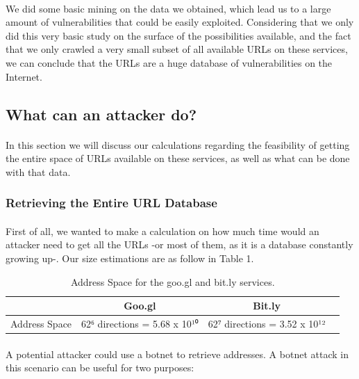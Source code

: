 \documentclass[12pt]{article}
\begin{document}
\paragraph{}
We did some basic mining on the data we obtained, which lead us to a large amount of vulnerabilities that could be easily exploited. Considering that we only did this very basic study on the surface of the possibilities available, and the fact that we only crawled a very small subset of all available URLs on these services, we can conclude that the URLs are a huge database of vulnerabilities on the Internet.

\subsection{What can an attacker do?}

\paragraph{}
In this section we will discuss our calculations regarding the feasibility of getting the entire space of URLs available on these services, as well as what can be done with that data.

\subsubsection{Retrieving the Entire URL Database}

\paragraph{}
First of all, we wanted to make a calculation on how much time would an attacker need to get all the URLs -or most of them, as it is a database constantly growing up-. Our size estimations are as follow in Table 1.

\begin{table}[h]
	\centering
		\begin{tabular}{ | l | c | c | c |}
 			\hline
			  & Goo.gl & Bit.ly \\ \hline
 			Address Space & 62⁶ directions = 5.68 x 10¹⁰ & 62⁷ directions = 3.52 x 10¹² \\
 			\hline
  		\end{tabular}
	\caption[A table]{Address Space for the goo.gl and bit.ly services.}
	\label{tab:albums}
\end{table}

\paragraph{}
A potential attacker could use a botnet to retrieve addresses. A botnet attack in this scenario can be useful for two purposes:
\end{document}
